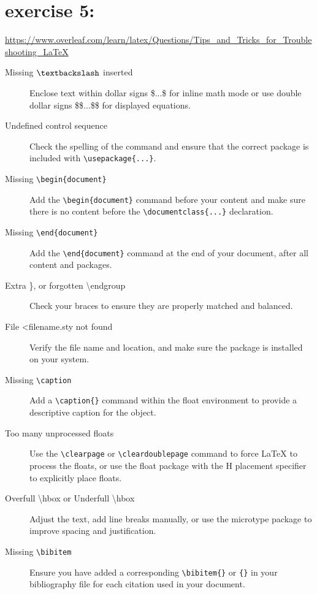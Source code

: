 \section{exercise 5:}
\url{https://www.overleaf.com/learn/latex/Questions/Tips_and_Tricks_for_Troubleshooting_LaTeX}
\begin{description}
	\item[Missing $\textbackslash$ inserted] Enclose text within dollar signs \$...\$ for inline math mode or use double dollar signs \$\$...\$\$ for displayed equations.
	\item[Undefined control sequence] Check the spelling of the command and ensure that the correct package is included with \texttt{\textbackslash usepackage\{...\}}.
	\item[Missing \texttt{\textbackslash begin\{document\}}] Add the \texttt{\textbackslash begin\{document\}} command before your content and make sure there is no content before the \texttt{\textbackslash documentclass\{...\}} declaration.
	\item[Missing \texttt{\textbackslash end\{document\}}] Add the \texttt{\textbackslash end\{document\}} command at the end of your document, after all content and packages.
	\item[Extra \}, or forgotten \textbackslash endgroup] Check your braces to ensure they are properly matched and balanced.
	\item[File \textless filename\>.sty not found] Verify the file name and location, and make sure the package is installed on your system.
	\item[Missing \texttt{\textbackslash caption}] Add a \texttt{\textbackslash caption\{\}} command within the float environment to provide a descriptive caption for the object.
	\item[Too many unprocessed floats] Use the \texttt{\textbackslash clearpage} or \texttt{\textbackslash cleardoublepage} command to force LaTeX to process the floats, or use the float package with the H placement specifier to explicitly place floats.
	\item[Overfull \textbackslash hbox or Underfull \textbackslash hbox] Adjust the text, add line breaks manually, or use the microtype package to improve spacing and justification.
	\item[Missing \texttt{\textbackslash bibitem}] Ensure you have added a corresponding \texttt{\textbackslash bibitem\{\}} or \texttt{\@entry\{\}} in your bibliography file for each citation used in your document.
\end{description}

